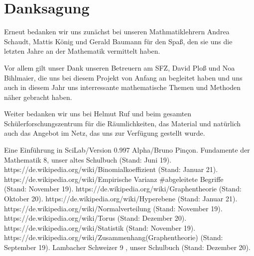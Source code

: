 \documentclass[11pt,a4paper]{article}
\numberwithin{equation}{section}
\numberwithin{table}{section}
\numberwithin{figure}{section}
\begin{document}
\section{Danksagung}
Erneut bedanken wir uns zunächst bei unseren Mathmatiklehrern Andrea Schaudt, Mattis König und Gerald Baumann für den Spaß, den sie uns die letzten Jahre an der Mathematik vermittelt haben.\par
\noindent Vor allem gilt unser Dank unseren Betreuern am SFZ, David Ploß und Noa Bihlmaier, die uns bei diesem Projekt von Anfang an begleitet haben und uns auch in diesem Jahr uns interressante mathematische Themen und Methoden näher gebracht haben.   \par\noindent Weiter bedanken wir uns bei Helmut Ruf und beim gesamten Schüler\-forschungszentrum für die Räumlichkeiten, das Material und natürlich auch das Angebot im Netz, das uns zur Verfügung gestellt wurde.
\renewcommand{\refname}{Quellenverzeichnis}
\begin{thebibliography}{[99]}

  Eine Einführung in SciLab/Version 0.997 Alpha/Bruno Pin\c{c}on.
  Fundamente der Mathematik 8, unser altes Schulbuch (Stand: Juni 19).
  https://de.wikipedia.org/wiki/Binomialkoeffizient (Stand: Januar 21).
  https://de.wikipedia.org/wiki/Empirische Varianz \#abgeleitete Begriffe \\ (Stand: November 19).
 https://de.wikipedia.org/wiki/Graphentheorie
(Stand: Oktober 20).
  https://de.wikipedia.org/wiki/Hyperebene (Stand: Januar 21).
     https://de.wikipedia.org/wiki/Normalverteilung (Stand: November 19).
      https://de.wikipedia.org/wiki/Torus (Stand: Dezember 20).
  https://de.wikipedia.org/wiki/Statistik (Stand: November 19).
 https://de.wikipedia.org/wiki/Zusammenhang(Graphentheorie) (Stand: September 19).
  Lambacher Schweizer 9 , unser Schulbuch (Stand: Dezember 20).
  
\end{thebibliography}
\end{document}
